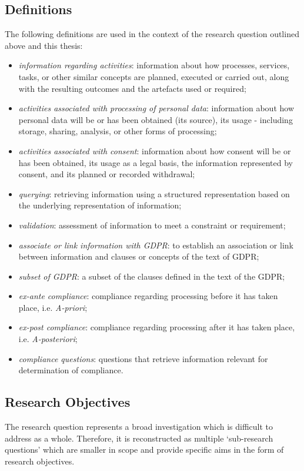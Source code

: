 \subsection{Definitions}\label{sec:intro:definitions}
The following definitions are used in the context of the research question outlined above and this thesis:
\begin{itemize}
    \item \textit{information regarding activities}: information about how processes, services, tasks, or other similar concepts are planned, executed or carried out, along with the resulting outcomes and the artefacts used or required;
    \item \textit{activities associated with processing of personal data}: information about how personal data will be or has been obtained (its source), its usage - including storage, sharing, analysis, or other forms of processing;
    \item \textit{activities associated with consent}: information about how consent will be or has been obtained, its usage as a legal basis, the information represented by consent, and its planned or recorded withdrawal;
    \item \textit{querying}: retrieving information using a structured representation based on the underlying representation of information;
    \item \textit{validation}: assessment of information to meet a constraint or requirement;
    \item \textit{associate or link information with GDPR}: to establish an association or link between information and clauses or concepts of the text of GDPR;
    \item \textit{subset of GDPR}: a subset of the clauses defined in the text of the GDPR;
    \item \textit{ex-ante compliance}: compliance regarding processing before it has taken place, i.e. \textit{A-priori};
    \item \textit{ex-post compliance}: compliance regarding processing after it has taken place, i.e. \textit{A-posteriori};
    \item \textit{compliance questions}: questions that retrieve information relevant for determination of compliance.
\end{itemize}

\subsection{Research Objectives}\label{sec:intro:RO}
The research question represents a broad investigation which is difficult to address as a whole. Therefore, it is reconstructed as multiple `sub-research questions' which are smaller in scope and provide specific aims in the form of research objectives.

